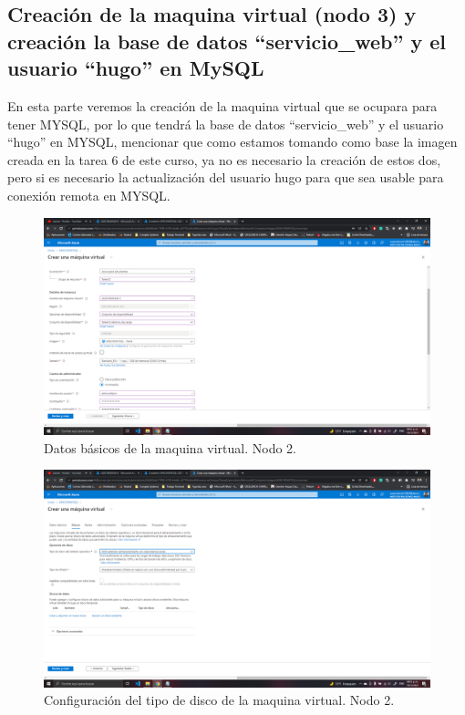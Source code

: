 \documentclass[11pt]{article}
\begin{document}
		\subsection{Creación de la maquina virtual (nodo 3) y creación la base de datos ``servicio\_web'' y el usuario ``hugo'' en MySQL}
		En esta parte veremos la creación de la maquina virtual que se ocupara para tener MYSQL, por lo que tendrá la base de datos ``servicio\_web'' y el usuario ``hugo'' en MYSQL, mencionar que como estamos tomando como base la imagen creada en la tarea 6 de este curso, ya no es necesario la creación de estos dos, pero si es necesario la actualización del usuario hugo para que sea usable para conexión remota en MYSQL.
		\begin{figure}[H]
			\centering
			\includegraphics[scale=0.34]{resources/datosbasicos2.png}
			\caption{Datos básicos de la maquina virtual. Nodo 2.}\label{fig:picture}
		\end{figure}
		\begin{figure}[H]
			\centering
			\includegraphics[scale=0.34]{resources/datosdisco2.png}
			\caption{Configuración del tipo de disco de la maquina virtual. Nodo 2.}\label{fig:picture}
		\end{figure}
\end{document}
